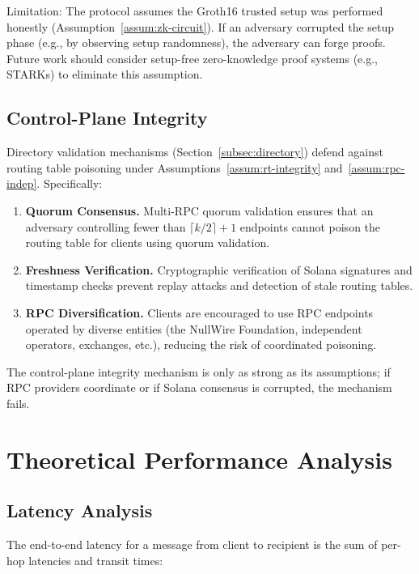 \documentclass[11pt]{article}
\theoremstyle{definition}
\theoremstyle{remark}
\begin{document}
Limitation: The protocol assumes the Groth16 trusted setup was performed honestly (Assumption~\ref{assum:zk-circuit}). If an adversary corrupted the setup phase (e.g., by observing setup randomness), the adversary can forge proofs. Future work should consider setup-free zero-knowledge proof systems (e.g., STARKs) to eliminate this assumption.

\subsection{Control-Plane Integrity}
\label{subsec:cp-integrity}

Directory validation mechanisms (Section~\ref{subsec:directory}) defend against routing table poisoning under Assumptions~\ref{assum:rt-integrity} and~\ref{assum:rpc-indep}. Specifically:

\begin{enumerate}
    \item \textbf{Quorum Consensus.} Multi-RPC quorum validation ensures that an adversary controlling fewer than $\lceil k/2 \rceil + 1$ endpoints cannot poison the routing table for clients using quorum validation.

    \item \textbf{Freshness Verification.} Cryptographic verification of Solana signatures and timestamp checks prevent replay attacks and detection of stale routing tables.

    \item \textbf{RPC Diversification.} Clients are encouraged to use RPC endpoints operated by diverse entities (the NullWire Foundation, independent operators, exchanges, etc.), reducing the risk of coordinated poisoning.
\end{enumerate}

The control-plane integrity mechanism is only as strong as its assumptions; if RPC providers coordinate or if Solana consensus is corrupted, the mechanism fails.

\section{Theoretical Performance Analysis}
\label{sec:perf}

\subsection{Latency Analysis}
\label{subsec:latency}

The end-to-end latency for a message from client to recipient is the sum of per-hop latencies and transit times:
\end{document}
